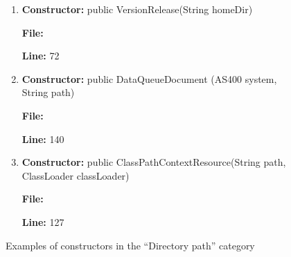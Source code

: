\begin{figure}

\begin{enumerate}

\item
\textbf{Constructor:} public VersionRelease(String homeDir)

\textbf{File:} 

\textbf{Line:} 72

\vspace{6px}

%
%
%

\item
\textbf{Constructor:} public DataQueueDocument (AS400 system, String path)

\textbf{File:} 

\textbf{Line:} 140

\vspace{6px}

\item
\textbf{Constructor:} public ClassPathContextResource(String path, ClassLoader classLoader)

\textbf{File:} 

\textbf{Line:} 127

\end{enumerate}

\vspace{-12px}

\caption{Examples of constructors in the ``Directory path'' category}
\label{path}
\end{figure}


